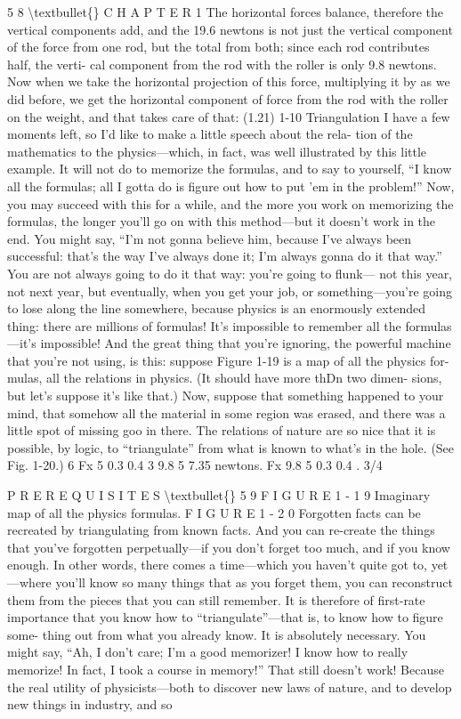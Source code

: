 \documentclass[10pt,oneside]{article}
\begin{document}
5 8 \textbackslash{}textbullet\{\} C H A P T E R  1 The horizontal forces balance, therefore the vertical components add, and the 19.6 newtons is not just the vertical component of the force from one rod, but the total from both; since each rod contributes half, the verti- cal component from the rod with the roller is only 9.8 newtons. Now when we take the horizontal projection of this force, multiplying it by as we did before, we get the horizontal component of force from the rod with the roller on the weight, and that takes care of that: (1.21) 1-10 Triangulation I have a few moments left, so I’d like to make a little speech about the rela- tion of the mathematics to the physics---which, in fact, was well illustrated by this little example. It will not do to memorize the formulas, and to say to yourself, “I know all the formulas; all I gotta do is figure out how to put ’em in the problem!” Now, you may succeed with this for a while, and the more you work on memorizing the formulas, the longer you’ll go on with this method---but it doesn’t work in the end. You might say, “I’m not gonna believe him, because I’ve always been successful: that’s the way I’ve always done it; I’m always gonna do it that way.” You are not always going to do it that way: you’re going to flunk--- not this year, not next year, but eventually, when you get your job, or something---you’re going to lose along the line somewhere, because physics is an enormously extended thing: there are millions of formulas! It’s impossible to remember all the formulas---it’s impossible! And the great thing that you’re ignoring, the powerful machine that you’re not using, is this: suppose Figure 1-19 is a map of all the physics for- mulas, all the relations in physics. (It should have more thDn two dimen- sions, but let’s suppose it’s like that.) Now, suppose that something happened to your mind, that somehow all the material in some region was erased, and there was a little spot of missing goo in there. The relations of nature are so nice that it is possible, by logic, to “triangulate” from what is known to what’s in the hole. (See Fig. 1-20.) 6  Fx 5 0.3 0.4 3 9.8 5 7.35 newtons. Fx 9.8 5 0.3 0.4 . 3/4\par

P R E R E Q U I S I T E S \textbackslash{}textbullet\{\} 5 9 F I G U R E 1 - 1 9 Imaginary map of all the physics formulas. F I G U R E 1 - 2 0 Forgotten facts can be recreated by triangulating from known facts. And you can re-create the things that you’ve forgotten perpetually---if you don’t forget too much, and if you know enough. In other words, there comes a time---which you haven’t quite got to, yet---where you’ll know so many things that as you forget them, you can reconstruct them from the pieces that you can still remember. It is therefore of first-rate importance that you know how to “triangulate”---that is, to know how to figure some- thing out from what you already know. It is absolutely necessary. You might say, “Ah, I don’t care; I’m a good memorizer! I know how to really memorize! In fact, I took a course in memory!” That still doesn’t work! Because the real utility of physicists---both to discover new laws of nature, and to develop new things in industry, and so\par
\end{document}

